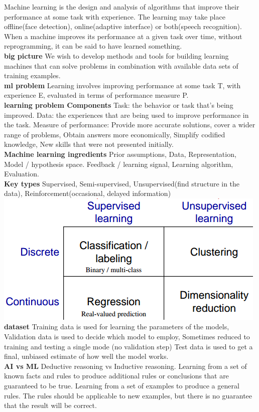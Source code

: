 \documentclass[cheatsheet.tex]{subfiles}
\begin{document}
Machine learning is the design and analysis of algorithms that improve their performance at some task with experience. The learning may take place offline(face detection), online(adaptive interface) or both(speech recognition). When a machine improves its performance at a given task over time, without reprogramming, it can be said to have learned something. 
\\
\textbf{big picture} We wish to develop methods and tools for building learning machines that can solve problems in combination with available data sets of training examples. 
\\
\textbf{ml problem} Learning involves improving performance at some task T, with experience E, evaluated in terms of performance measure P. 
\\
\textbf{learning problem Components} Task: the behavior or task that's being improved. Data: the experiences that are being used to improve performance in the task. Measure of performance: Provide more accurate solutions, cover a wider range of problems, Obtain answers more economically, Simplify codified knowledge, New skills that were not presented initially.
\\
\textbf{Machine learning ingredients} Prior assumptions, Data, Representation, Model / hypothesis space. Feedback / learning signal, Learning algorithm, Evaluation.
\\
\textbf{Key types} Supervised, Semi-supervised, Unsupervised(find structure in the data), Reinforcement(occasional, delayed information)
\includegraphics[width=.6\linewidth]{problems.png}\\
\textbf{dataset} \textbullet Training data is used for learning the parameters of the models, \textbullet Validation data is used to decide which model to employ, Sometimes reduced to training and testing a single mode (no validation step) \textbullet Test data is used to get a final, unbiased estimate of how well the model works. 
\\
\textbf{AI vs ML} Deductive reasoning vs Inductive reasoning. \textbullet Learning from a set of known facts and rules to produce additional rules or conclusions that are guaranteed to be true. \textbullet Learning from a set of examples to produce a general rules. The rules should be applicable to new examples, but there is no guarantee that the result will be correct.
\end{document}
